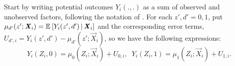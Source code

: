 Start by writing potential outcomes $Y_i(., .)$ as a sum of observed and unobserved factors, following the notation of \cite{heckman2005structural}.
For each $z',d' = 0,1$, put $\mu_{d'}(z'; \boldsymbol{\mathit{X}}_i) = \mathbb{E}_{} \left[ Y_i(z', d') \, \middle\vert \, \boldsymbol{\mathit{X}}_i \right]$ and the corresponding error terms, $U_{d', i} = Y_i(z', d') - \mu_{d'}(z'; \vec X_i)$, so we have the following expressions:
\[ Y_i(Z_i, 0)  = \mu_{0}(Z_i; \vec X_i) + U_{0,i}, \;\;
    Y_i(Z_i, 1) = \mu_{1}(Z_i; \vec X_i) + U_{1,i}. \]

